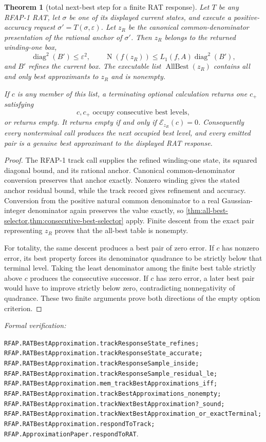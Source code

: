 \documentclass[11pt]{article}
\newtheorem{theorem}{Theorem}[section]
\newcommand{\Norm}[1]{\operatorname{N}\!\left(#1\right)}
\newcommand{\diamq}{\operatorname{diag}^{2}}
\newcommand{\eps}{\varepsilon}
\newcommand{\leanref}[1]{\par\smallskip\noindent
  \emph{Formal verification:}\par\nobreak
  {\raggedright\nolinkurl{#1}.\par}}
\begin{document}
\begin{theorem}[total next-best step for a finite RAT response]
\label{thm:rat-response-next-best}
Let $T$ be any RFAP-1 RAT, let $\sigma$ be one of its displayed current
states, and execute a positive-accuracy request
$\sigma'=T(\sigma,\eps)$.  Let $z_R$ be the canonical common-denominator
presentation of the rational anchor of $\sigma'$.  Then $z_R$ belongs to the
returned winding-one box,
\[
 \diamq(B')\le\eps^2,
 \qquad
 \Norm{f(z_R)}\le L_1(f,A)\diamq(B'),
\]
and $B'$ refines the current box.  The executable list
$\operatorname{AllBest}(z_R)$ contains all and only best approximants to
$z_R$ and is nonempty.

If $c$ is any member of this list, a terminating optional calculation returns
one $c_+$ satisfying
\[
       c,c_+\text{ occupy consecutive best levels},
\]
or returns empty.  It returns empty if and only if
$\mathcal E_{z_R}(c)=0$.  Consequently every nonterminal call produces the
next occupied best level, and every emitted pair is a genuine best
approximant to the displayed RAT response.
\end{theorem}

\begin{proof}
The RFAP-1 track call supplies the refined winding-one state, its squared
diagonal bound, and its rational anchor.  Canonical common-denominator
conversion preserves that anchor exactly.  Nonzero winding gives the stated
anchor residual bound, while the track record gives refinement and
accuracy.  Conversion from the positive natural common denominator to a real
Gaussian-integer denominator again preserves the value exactly, so
\cref{thm:all-best-selector,thm:consecutive-best-selector} apply.  Finite
descent from the exact pair representing $z_R$ proves that the all-best table
is nonempty.

For totality, the same descent produces a best pair of zero error.  If $c$
has nonzero error, its best property forces
its denominator quadrance to be strictly below that terminal level.  Taking
the least denominator among the finite best table strictly above $c$ produces
the consecutive successor.  If $c$ has zero error, a later best pair would
have to improve strictly below zero, contradicting nonnegativity of
quadrance.  These two finite arguments prove both directions of the empty
option criterion.
\end{proof}

\leanref{RFAP.RATBestApproximation.trackResponseState_refines;
RFAP.RATBestApproximation.trackResponseState_accurate;
RFAP.RATBestApproximation.trackResponseSample_inside;
RFAP.RATBestApproximation.trackResponseSample_residual_le;
RFAP.RATBestApproximation.mem_trackBestApproximations_iff;
RFAP.RATBestApproximation.trackBestApproximations_nonempty;
RFAP.RATBestApproximation.trackNextBestApproximation?_sound;
RFAP.RATBestApproximation.trackNextBestApproximation_or_exactTerminal;
RFAP.RATBestApproximation.respondToTrack;
RFAP.ApproximationPaper.respondToRAT}
\end{document}

